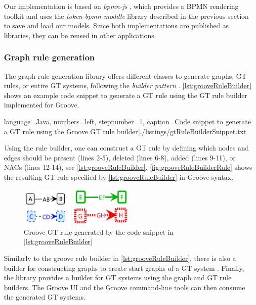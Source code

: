 \documentclass{lmcs} %
\begin{document}
Our implementation is based on \textit{bpmn-js} \cite{camundaservicesgmbhBpmnjs2023}, which provides a BPMN rendering toolkit and uses the \textit{token-bpmn-moddle} library described in the previous section to save and load our models.
Since both implementations are published as libraries, they can be reused in other applications. %

\subsubsection{Graph rule generation}
The graph-rule-generation library offers different classes to generate graphs, GT rules, or entire GT systems, following the \textit{builder pattern} \cite{gammaDesignPatternsElements1995}.
\autoref{lst:grooveRuleBuilder} shows an example code snippet to generate a GT rule using the GT rule builder implemented for Groove.

 language=Java, numbers=left,
    stepnumber=1, caption=Code snippet to generate a GT rule using the Groove GT rule builder]{./listings/gtRuleBuilderSnippet.txt}

Using the rule builder, one can construct a GT rule by defining which nodes and edges should be present (lines 2-5), deleted (lines 6-8), added (lines 9-11), or NACs (lines 12-14), see \autoref{lst:grooveRuleBuilder}.
\autoref{fig:grooveRuleBuilderRule} shows the resulting GT rule specified by \autoref{lst:grooveRuleBuilder} in Groove syntax.

\begin{figure}[ht]
    \centering
    \includegraphics[width=0.5\textwidth]{images/rule.pdf}
    \caption{Groove GT rule generated by the code snippet in \autoref{lst:grooveRuleBuilder}}
    \label{fig:grooveRuleBuilderRule}
\end{figure}

Similarly to the groove rule builder in \autoref{lst:grooveRuleBuilder}, there is also a builder for constructing graphs to create start graphs of a GT system \cite{timkrauterLMCS2024Artifacts2023}.
Finally, the library provides a builder for GT systems using the graph and GT rule builders.
The Groove UI and the Groove command-line tools can then consume the generated GT systems.
\end{document}
